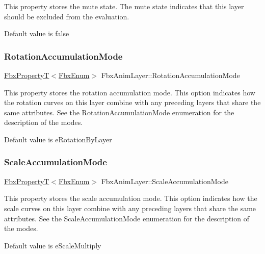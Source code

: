 This property stores the mute state. The mute state indicates that this layer should be excluded from the evaluation.

Default value is {\ttfamily false} \mbox{\label{class_fbx_anim_layer_ae8d47b5fabab90773e9a40aeef934945}} 
\subsubsection{\texorpdfstring{Rotation\+Accumulation\+Mode}{RotationAccumulationMode}}
{\footnotesize\ttfamily \hyperlink{class_fbx_property_t}{Fbx\+PropertyT}$<$\hyperlink{fbxtypes_8h_a9a28614cb4272a0ad7d748eda7f3d3e5}{Fbx\+Enum}$>$ Fbx\+Anim\+Layer\+::\+Rotation\+Accumulation\+Mode}

This property stores the rotation accumulation mode. This option indicates how the rotation curves on this layer combine with any preceding layers that share the same attributes. See the Rotation\+Accumulation\+Mode enumeration for the description of the modes.

Default value is {\ttfamily e\+Rotation\+By\+Layer} \mbox{\label{class_fbx_anim_layer_a50ec8bebaa1241cc168fae6bcf5c670f}} 
\subsubsection{\texorpdfstring{Scale\+Accumulation\+Mode}{ScaleAccumulationMode}}
{\footnotesize\ttfamily \hyperlink{class_fbx_property_t}{Fbx\+PropertyT}$<$\hyperlink{fbxtypes_8h_a9a28614cb4272a0ad7d748eda7f3d3e5}{Fbx\+Enum}$>$ Fbx\+Anim\+Layer\+::\+Scale\+Accumulation\+Mode}

This property stores the scale accumulation mode. This option indicates how the scale curves on this layer combine with any preceding layers that share the same attributes. See the Scale\+Accumulation\+Mode enumeration for the description of the modes.

Default value is {\ttfamily e\+Scale\+Multiply} \mbox{\label{class_fbx_anim_layer_a0e002d0db3b5998a4c016cffb7f5c252}} 
